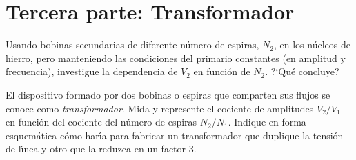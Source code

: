 \documentclass[laboratorio]{guia}
\begin{document}
\section{Tercera parte: Transformador}

Usando bobinas secundarias de diferente n\'umero de espiras, $N_2$, en los n\'ucleos de
hierro, pero manteniendo las condiciones del primario constantes (en amplitud y
frecuencia), investigue la dependencia de $V_2$ en funci\'on de $N_2$. ?`Qu\'e
concluye? 

El dispositivo formado por dos bobinas o espiras que comparten sus flujos se
conoce como {\it transformador}. Mida y represente el cociente de amplitudes
$V_2/V_1$ en funci\'on del cociente del n\'umero de espiras $N_2/N_1$. Indique
en forma esquem\'atica c\'omo har\'\i a para fabricar un transformador que
duplique la tensi\'on de l\'\i nea y otro que la reduzca en un factor 3. 

\nocite{Alonso1998,Purcell1988,Reitz1996,Trelles1984,Reitz1996}
 

\end{document}
